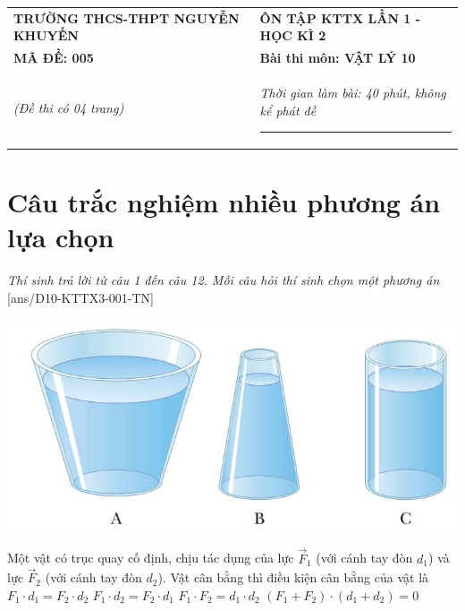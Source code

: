 \begin{center}
	\begin{tabular}{M{9.25cm}M{8.75cm}}
		\textbf{TRƯỜNG THCS-THPT NGUYỄN KHUYẾN}& \textbf{ÔN TẬP KTTX LẦN 1 - HỌC KÌ 2}\\
		\textbf{MÃ ĐỀ: 005}& \textbf{Bài thi môn: VẬT LÝ 10}\\
		\textit{(Đề thi có 04 trang)}& \textit{Thời gian làm bài: 40 phút, không kể phát đề}
		
		\noindent\rule{4cm}{0.8pt} \\
	\end{tabular}
\end{center}
\vspace{-0.5cm}
\setcounter{section}{0}
\section{Câu trắc nghiệm nhiều phương án lựa chọn}
\textit{Thí sinh trả lời từ câu 1 đến câu 12. Mỗi câu hỏi thí sinh chọn một phương án}
\setcounter{ex}{0}
[ans/D10-KTTX3-001-TN]
\begin{ex}
{\includegraphics[scale=0.6]{../figs/D10-KTTX3-001-2}}
	\loigiai{}
\end{ex}
\begin{ex}
	Một vật có trục quay cố định, chịu tác dụng của lực $\vec{F}_1$ (với cánh tay đòn $d_1$) và lực $\vec{F}_2$ (với cánh tay đòn $d_2$). Vật cân bằng thì điều kiện cân bằng của vật là
	\choice
	{\True $F_1\cdot d_1=F_2\cdot d_2$}
	{$F_1\cdot d_2=F_2\cdot d_1$}
	{$F_1\cdot F_2=d_1\cdot d_2$}
	{$\left(F_1+F_2\right)\cdot\left(d_1+d_2\right)=0$}
	\loigiai{}
\end{ex}
